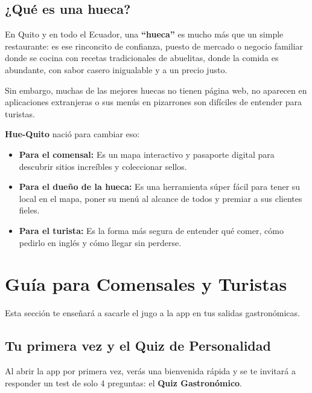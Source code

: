 \documentclass[11pt, a4paper, oneside]{article}
\begin{document}
\subsection{¿Qué es una hueca?}
En Quito y en todo el Ecuador, una \textbf{``hueca''} es mucho más que un simple restaurante: es ese rinconcito de confianza, puesto de mercado o negocio familiar donde se cocina con recetas tradicionales de abuelitas, donde la comida es abundante, con sabor casero inigualable y a un precio justo.

Sin embargo, muchas de las mejores huecas no tienen página web, no aparecen en aplicaciones extranjeras o sus menús en pizarrones son difíciles de entender para turistas. 

\textbf{Hue-Quito} nació para cambiar eso:
\begin{itemize}
  \item \textbf{Para el comensal:} Es un mapa interactivo y pasaporte digital para descubrir sitios increíbles y coleccionar sellos.
  \item \textbf{Para el dueño de la hueca:} Es una herramienta súper fácil para tener su local en el mapa, poner su menú al alcance de todos y premiar a sus clientes fieles.
  \item \textbf{Para el turista:} Es la forma más segura de entender qué comer, cómo pedirlo en inglés y cómo llegar sin perderse.
\end{itemize}

\section{Guía para Comensales y Turistas}

Esta sección te enseñará a sacarle el jugo a la app en tus salidas gastronómicas.

\subsection{Tu primera vez y el Quiz de Personalidad}
Al abrir la app por primera vez, verás una bienvenida rápida y se te invitará a responder un test de solo 4 preguntas: el \textbf{Quiz Gastronómico}.
\end{document}
